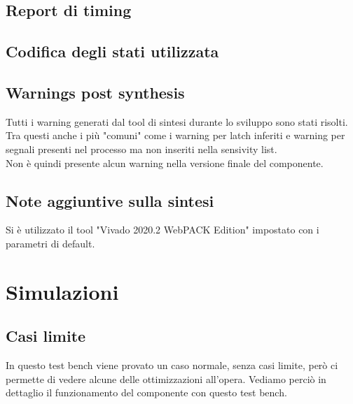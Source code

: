 \documentclass{article}
\begin{document}
\subsection{Report di timing} %


\subsection{Codifica degli stati utilizzata}


\subsection{Warnings post synthesis}
Tutti i warning generati dal tool di sintesi durante lo sviluppo sono stati risolti. Tra questi anche i più "comuni" come i warning per latch inferiti e warning per segnali presenti nel processo ma non inseriti nella sensivity list.\\
Non è quindi presente alcun warning nella versione finale del componente.

\subsection{Note aggiuntive sulla sintesi}
Si è utilizzato il tool "Vivado 2020.2 WebPACK Edition" impostato con i parametri di default.

\vspace{4mm}
\titlerule[0.4pt]


\pagebreak
\section{Simulazioni}

\subsection{Casi limite}
In questo test bench viene provato un caso normale, senza casi limite, però ci permette di vedere alcune delle ottimizzazioni all'opera. Vediamo perciò in dettaglio il funzionamento del componente con questo test bench.
\end{document}
